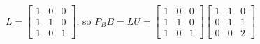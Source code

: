 \documentclass[12pt]{article}
\begin{document}
\begin{itemize}
\begin{itemize}
\begin{equation*}
               \end{equation*}
               $L = \left[\begin{array}{ccc} 1 & 0 & 0\\ 1 & 1 & 0\\ 1& 0& 1\end{array}\right]$, so
               $P_BB=LU=\left[\begin{array}{ccc} 1 & 0 & 0\\ 1 & 1 & 0\\ 1& 0& 1\end{array}\right]
               \left[\begin{array}{ccc} 1 & 1 & 0\\ 0 & 1 & 1\\ 0& 0& 2\end{array}\right]$
               
	\end{itemize}

\end{itemize}
\end{document}
